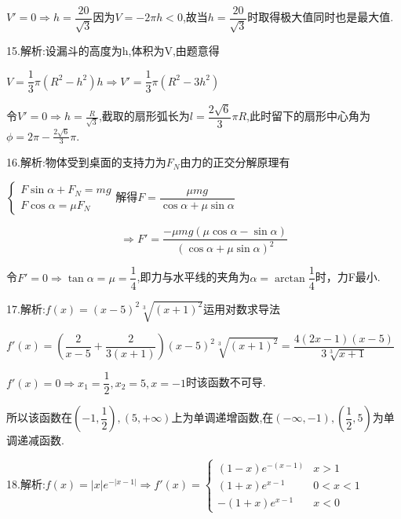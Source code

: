 $V' = 0 \Rightarrow h = \dfrac{20}{{\sqrt 3 }}$因为$V =  - 2\pi h < 0$,故当$h = \dfrac{20}{{\sqrt 3 }}$时取得极大值同时也是最大值.

15.解析:设漏斗的高度为h,体积为V,由题意得

$V = \dfrac{1}{3}\pi \left( {{R^2} - {h^2}} \right)h \Rightarrow V' = \dfrac{1}{3}\pi \left( {{R^2} - 3{h^2}} \right)$

令$V' = 0 \Rightarrow h = \frac{R}{{\sqrt 3 }}$,截取的扇形弧长为$l = \dfrac{{2\sqrt 6 }}{3}\pi R$,此时留下的扇形中心角为$\phi  = 2\pi  - \frac{{2\sqrt 6 }}{3}\pi .$

16.解析:物体受到桌面的支持力为${F_N}$由力的正交分解原理有

$\left\{ {\begin{array}{*{20}{c}}
{F\sin \alpha  + {F_N} = mg}\\
{F\cos \alpha  = \mu {F_N}}
\end{array}} \right.$解得$F = \dfrac{{\mu mg}}{{\cos \alpha  + \mu \sin \alpha }}$

$$ \Rightarrow F' = \dfrac{{ - \mu mg\left( {\mu \cos \alpha  - \sin \alpha } \right)}}{{{{\left( {\cos \alpha  + \mu \sin \alpha } \right)}^2}}}$$

令$F' = 0 \Rightarrow \tan \alpha  = \mu  = \dfrac{1}{4}$,即力与水平线的夹角为$\alpha  = \arctan \dfrac{1}{4}$时，力F最小.

17.解析:$f\left( x \right) = {\left( {x - 5} \right)^2}\sqrt[3]{{{{\left( {x + 1} \right)}^2}}}$运用对数求导法

$f'\left( x \right) = \left( {\dfrac{2}{{x - 5}} + \dfrac{2}{{3\left( {x + 1} \right)}}} \right){\left( {x - 5} \right)^2}\sqrt[3]{{{{\left( {x + 1} \right)}^2}}} = \dfrac{{4\left( {2x - 1} \right)\left( {x - 5} \right)}}{{3\sqrt[3]{{x + 1}}}}$

$f'\left( x \right) = 0 \Rightarrow {x_1} = \dfrac{1}{2},{x_2} = 5,x =  - 1$时该函数不可导.

所以该函数在$\left( { - 1,\dfrac{1}{2}} \right),\left( {5, + \infty } \right)$上为单调递增函数,在$\left( { - \infty , - 1} \right),\left( {\dfrac{1}{2},5} \right)$为单调递减函数.

18.解析:$f\left( x \right) = \left| x \right|{e^{ - \left| {x - 1} \right|}} \Rightarrow f'\left( x \right) = \left\{ {\begin{array}{*{20}{l}}
{\left( {1 - x} \right){e^{ - \left( {x - 1} \right)}}}&{x > 1}\\
{\left( {1 + x} \right){e^{x - 1}}}&{0 < x < 1}\\
{ - \left( {1 + x} \right){e^{x - 1}}}&{x < 0}
\end{array}} \right.$

